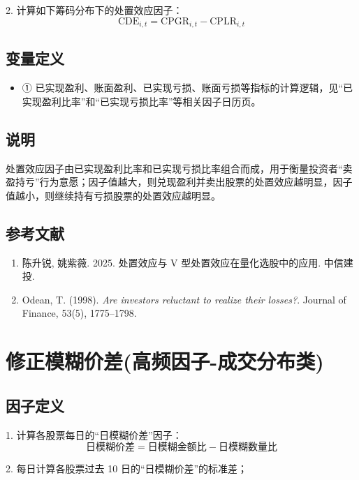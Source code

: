 \documentclass{article}
\begin{document}
2. 计算如下筹码分布下的处置效应因子：
\begin{equation}
    \mathrm{CDE}_{i,t} = \mathrm{CPGR}_{i,t} - \mathrm{CPLR}_{i,t}
\end{equation}

\subsection{变量定义}
\begin{itemize}
    \item ① 已实现盈利、账面盈利、已实现亏损、账面亏损等指标的计算逻辑，见“已实现盈利比率”和“已实现亏损比率”等相关因子日历页。
\end{itemize}

\subsection{说明}
处置效应因子由已实现盈利比率和已实现亏损比率组合而成，用于衡量投资者“卖盈持亏”行为意愿；因子值越大，则兑现盈利并卖出股票的处置效应越明显，因子值越小，则继续持有亏损股票的处置效应越明显。

\subsection{参考文献}
\begin{enumerate}
    \item 陈升锐, 姚紫薇. 2025. 处置效应与 V 型处置效应在量化选股中的应用. 中信建投.
    \item Odean, T. (1998). \textit{Are investors reluctant to realize their losses?}. Journal of Finance, 53(5), 1775–1798.
\end{enumerate}

\section{修正模糊价差(高频因子-成交分布类)}

\subsection{因子定义}

1. 计算各股票每日的“日模糊价差”因子：
   \begin{equation}
       \text{日模糊价差} = \text{日模糊金额比} - \text{日模糊数量比}
   \end{equation}

2. 每日计算各股票过去 10 日的“日模糊价差”的标准差；
\end{document}
